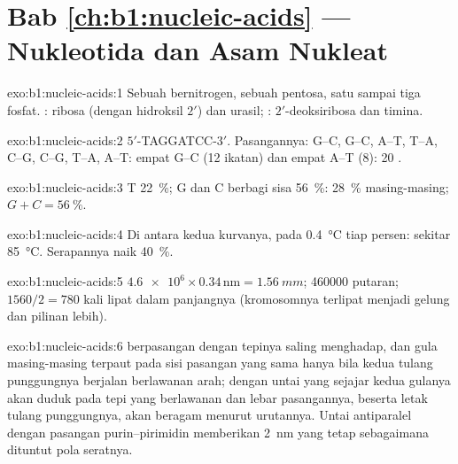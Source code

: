 \section*{Bab \ref{ch:b1:nucleic-acids} --- Nukleotida dan Asam Nukleat}

\begin{solution}{exo:b1:nucleic-acids:1}
Sebuah  bernitrogen, sebuah pentosa, satu sampai tiga fosfat. :
ribosa (dengan hidroksil $2'$) dan urasil; : $2'$-deoksiribosa dan
timina.
\end{solution}

\begin{solution}{exo:b1:nucleic-acids:2}
$5'$-TAGGATCC-$3'$. Pasangannya: G--C, G--C, A--T, T--A, C--G, C--G,
T--A, A--T: empat G--C (12 ikatan) dan empat A--T (8): 20 .
\end{solution}

\begin{solution}{exo:b1:nucleic-acids:3}
T \qty{22}{\%}; G dan C berbagi sisa \qty{56}{\%}: \qty{28}{\%}
masing-masing; $G + C = \qty{56}{\%}$.
\end{solution}

\begin{solution}{exo:b1:nucleic-acids:4}
Di antara kedua kurvanya, pada \qty{0.4}{\celsius} tiap persen: sekitar
\qty{85}{\celsius}. Serapannya naik \qty{40}{\%}.
\end{solution}

\begin{solution}{exo:b1:nucleic-acids:5}
$\num{4.6e6}\times 0.34\,\mathrm{nm} = \qty{1.56}{mm}$; \num{460000}
putaran; $1560/2 = 780$ kali lipat dalam panjangnya (kromosomnya
terlipat menjadi gelung dan pilinan lebih).
\end{solution}

\begin{solution}{exo:b1:nucleic-acids:6}
 berpasangan dengan tepinya saling menghadap, dan gula
masing-masing terpaut pada sisi pasangan yang sama hanya bila kedua
tulang punggungnya berjalan berlawanan arah; dengan untai yang sejajar
kedua gulanya akan duduk pada tepi yang berlawanan dan lebar
pasangannya, beserta letak tulang punggungnya, akan beragam menurut
urutannya. Untai antiparalel dengan pasangan purin--pirimidin
memberikan \qty{2}{nm} yang tetap sebagaimana dituntut pola seratnya.
\end{solution}

